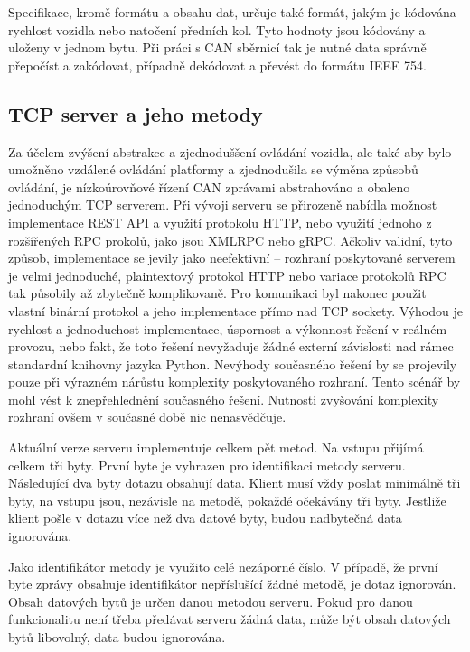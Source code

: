 \documentclass[czech,bachelor,dept460,male,cpp,cpdeclaration]{diploma}
\begin{document}
Specifikace, kromě formátu a obsahu dat, určuje také formát, jakým je kódována rychlost vozidla nebo natočení předních kol. Tyto
hodnoty jsou kódovány a uloženy v jednom bytu. Při práci s CAN sběrnicí tak je nutné data správně přepočíst a zakódovat, případně
dekódovat a převést do formátu IEEE 754.

\subsection{TCP server a jeho metody}

Za účelem zvýšení abstrakce a zjednoduššení ovládání vozidla, ale také aby bylo umožněno vzdálené ovládání platformy
a zjednodušila se výměna způsobů ovládání, je nízkoúrovňové řízení CAN zprávami abstrahováno a obaleno jednoduchým TCP serverem.
Při vývoji serveru se přirozeně nabídla možnost implementace REST API a využití protokolu HTTP, nebo využití jednoho z rozšířených
RPC prokolů, jako jsou XMLRPC nebo gRPC. Ačkoliv validní, tyto způsob, implementace se jevily jako neefektivní -- rozhraní 
poskytované serverem je velmi jednoduché, plaintextový protokol HTTP nebo variace protokolů RPC tak působily až zbytečně 
komplikovaně. Pro komunikaci byl nakonec použit vlastní binární protokol a jeho implementace přímo nad TCP sockety. 
Výhodou je rychlost a jednoduchost implementace, úspornost a výkonnost řešení v reálném provozu, nebo fakt, že toto řešení 
nevyžaduje žádné externí závislosti nad rámec standardní knihovny jazyka Python. Nevýhody současného řešení by se projevily 
pouze při výrazném nárůstu komplexity poskytovaného rozhraní. Tento scénář by mohl vést k znepřehlednění současného řešení. 
Nutnosti zvyšování komplexity rozhraní ovšem v současné době nic nenasvědčuje. 

Aktuální verze serveru implementuje celkem pět metod. Na vstupu přijímá celkem tři byty. První byte je vyhrazen pro identifikaci 
metody serveru. Následující dva byty dotazu obsahují data. Klient musí vždy poslat minimálně tři byty, na vstupu jsou, nezávisle
na metodě, pokaždé očekávány tři byty. Jestliže klient pošle v dotazu více než dva datové byty, budou nadbytečná data ignorována.

Jako identifikátor metody je využito celé nezáporné číslo. V případě, že první byte zprávy obsahuje identifikátor nepříslušící 
žádné metodě, je dotaz ignorován. Obsah datových bytů je určen danou metodou serveru. Pokud pro danou funkcionalitu není třeba 
předávat serveru žádná data, může být obsah datových bytů libovolný, data budou ignorována. 
\end{document}
